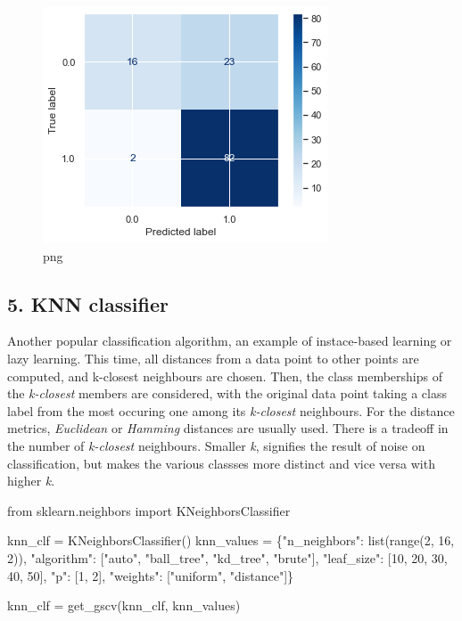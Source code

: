 \documentclass[]{article}
\newenvironment{Shaded}{}{}
\newcommand{\BuiltInTok}[1]{#1}
\newcommand{\DecValTok}[1]{\textcolor[rgb]{0.25,0.63,0.44}{#1}}
\newcommand{\ImportTok}[1]{#1}
\newcommand{\NormalTok}[1]{#1}
\newcommand{\OperatorTok}[1]{\textcolor[rgb]{0.40,0.40,0.40}{#1}}
\newcommand{\StringTok}[1]{\textcolor[rgb]{0.25,0.44,0.63}{#1}}
\begin{document}
\begin{figure}
\centering
\includegraphics{notebook_files/notebook_44_3.png}
\caption{png}
\end{figure}

\hypertarget{knn-classifier}{%
\subsection{5. KNN classifier}\label{knn-classifier}}

Another popular classification algorithm, an example of instace-based
learning or lazy learning. This time, all distances from a data point to
other points are computed, and k-closest neighbours are chosen. Then,
the class memberships of the \emph{k-closest} members are considered,
with the original data point taking a class label from the most occuring
one among its \emph{k-closest} neighbours. For the distance metrics,
\emph{Euclidean} or \emph{Hamming} distances are usually used. There is
a tradeoff in the number of \emph{k-closest} neighbours. Smaller
\emph{k}, signifies the result of noise on classification, but makes the
various classses more distinct and vice versa with higher \emph{k}.

\begin{Shaded}
\begin{Highlighting}[]
\ImportTok{from}\NormalTok{ sklearn.neighbors }\ImportTok{import}\NormalTok{ KNeighborsClassifier}

\NormalTok{knn_clf }\OperatorTok{=}\NormalTok{ KNeighborsClassifier()}
\NormalTok{knn_values }\OperatorTok{=}\NormalTok{ \{}\StringTok{"n_neighbors"}\NormalTok{: }\BuiltInTok{list}\NormalTok{(}\BuiltInTok{range}\NormalTok{(}\DecValTok{2}\NormalTok{, }\DecValTok{16}\NormalTok{, }\DecValTok{2}\NormalTok{)), }
              \StringTok{"algorithm"}\NormalTok{: [}\StringTok{"auto"}\NormalTok{, }\StringTok{"ball_tree"}\NormalTok{, }\StringTok{"kd_tree"}\NormalTok{, }\StringTok{"brute"}\NormalTok{],}
              \StringTok{"leaf_size"}\NormalTok{: [}\DecValTok{10}\NormalTok{, }\DecValTok{20}\NormalTok{, }\DecValTok{30}\NormalTok{, }\DecValTok{40}\NormalTok{, }\DecValTok{50}\NormalTok{], }
              \StringTok{"p"}\NormalTok{: [}\DecValTok{1}\NormalTok{, }\DecValTok{2}\NormalTok{], }
              \StringTok{"weights"}\NormalTok{: [}\StringTok{"uniform"}\NormalTok{, }\StringTok{"distance"}\NormalTok{]\}}
              
\NormalTok{knn_clf }\OperatorTok{=}\NormalTok{ get_gscv(knn_clf, knn_values)}
\end{Highlighting}
\end{Shaded}
\end{document}
